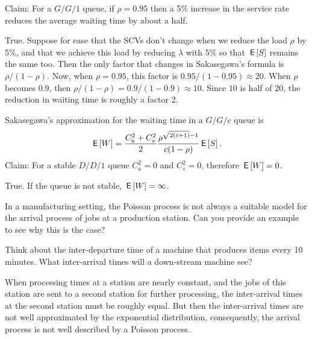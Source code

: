 \documentclass[stochastic-or.tex]{subfiles}
\begin{document}
\begin{truefalse}
Claim: For a $G/G/1$ queue, if $\rho=0.95$ then a 5\% increase in the service rate reduces the average waiting time by about a half.
    \begin{solution}
        True. Suppose for ease that the SCVs don't change when we reduce the load $\rho$ by $5\%$, and that we achieve this load by reducing $\lambda$ with $5\%$ so that $\,\mathsf{E}\left[S\right]$ remains the same too. Then the only factor that changes in Sakasegawa's formula is $\rho/(1-\rho)$. Now, when $\rho=0.95$, this factor is $0.95/(1-0.95) \approx 20$. When $\rho$ becomes $0.9$, then $\rho/(1-\rho) = 0.9/(1-0.9) \approx 10$. Since $10$ is half of $20$, the reduction in waiting time is roughly a factor 2.
    \end{solution}
\end{truefalse}

\begin{truefalse}
Sakasegawa's approximation for the waiting time in a $G/G/c$ queue is
\begin{equation*}
 \,\mathsf{E}\left[W\right] = \frac{C_a^2+C_s^2}2 \frac{\rho^{\sqrt{2(c+1)}-1}}{c(1-\rho)} \,\mathsf{E}\left[S\right].
\end{equation*}
Claim: For a stable $D/D/1$ queue $C_a^2=0$ and $C_s^2=0$, therefore $\,\mathsf{E}\left[W\right]=0$.
\begin{solution}
True. If the queue is not stable, $\,\mathsf{E}\left[W\right] = \infty$.
\end{solution}
\end{truefalse}

\begin{exercise}
In a manufacturing setting, the Poisson process is not always a suitable model for the arrival process of jobs at a production station. Can you provide an example to see why this is the case?
\begin{hint}
Think about the inter-departure time of a machine that produces items every 10 minutes. What inter-arrival times will a down-stream machine see?

\end{hint}
\begin{solution}
  When processing times at a station are nearly constant, and the jobs of this station are sent to a second station for further processing, the inter-arrival times at the second station must be roughly equal.
  But then the inter-arrival times are not well approximated by the exponential distribution, consequently, the arrival process is not well described by a Poisson process.
\end{solution}
\end{exercise}
\end{document}
